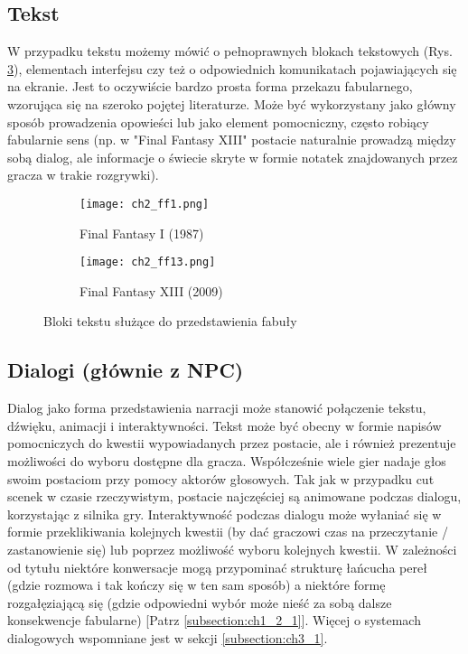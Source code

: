 \newpage

\subsection{Tekst}

W przypadku tekstu możemy mówić o pełnoprawnych blokach tekstowych (Rys. \ref{fig:ch1_2_2_text}),
elementach interfejsu czy też o odpowiednich komunikatach pojawiających się na ekranie. Jest to
oczywiście bardzo prosta forma przekazu fabularnego, wzorująca się na szeroko pojętej literaturze.
Może być wykorzystany jako główny sposób prowadzenia opowieści lub jako element pomocniczny, często
robiący fabularnie sens (np. w "Final Fantasy XIII" postacie naturalnie prowadzą między sobą dialog,
ale informacje o świecie skryte w formie notatek znajdowanych przez gracza w trakie rozgrywki).

\begin{figure}[h]
    \begin{subfigure}{0.49\textwidth}
        \texttt{[image: ch2\_ff1.png]}
        \caption{Final Fantasy I (1987)}
        \label{subfig:ch2_2_text1}
    \end{subfigure}
    \begin{subfigure}{0.49\textwidth}
        \texttt{[image: ch2\_ff13.png]}
        \caption{Final Fantasy XIII (2009)}
        \label{subfig:ch2_2_text2}
    \end{subfigure}
    \caption{Bloki tekstu służące do przedstawienia fabuły}
    \label{fig:ch1_2_2_text}
\end{figure}

\subsection{Dialogi (głównie z NPC)}

Dialog jako forma przedstawienia narracji może stanowić połączenie tekstu, dźwięku, animacji i
interaktywności. Tekst może być obecny w formie napisów pomocniczych do kwestii wypowiadanych przez
postacie, ale i również prezentuje możliwości do wyboru dostępne dla gracza. Współcześnie wiele gier
nadaje głos swoim postaciom przy pomocy aktorów głosowych. Tak jak w przypadku cut scenek w czasie
rzeczywistym, postacie najczęściej są animowane podczas dialogu, korzystając z silnika gry.
Interaktywność podczas dialogu może wyłaniać się w formie przeklikiwania kolejnych kwestii (by dać
graczowi czas na przeczytanie / zastanowienie się) lub poprzez możliwość wyboru kolejnych kwestii.
W zależności od tytułu niektóre konwersacje mogą przypominać strukturę łańcucha pereł (gdzie
rozmowa i tak kończy się w ten sam sposób) a niektóre formę rozgałęziającą się (gdzie odpowiedni
wybór może nieść za sobą dalsze konsekwencje fabularne) [Patrz \ref{subsection:ch1_2_1}]. Więcej
o systemach dialogowych wspomniane jest w sekcji \ref{subsection:ch3_1}.

